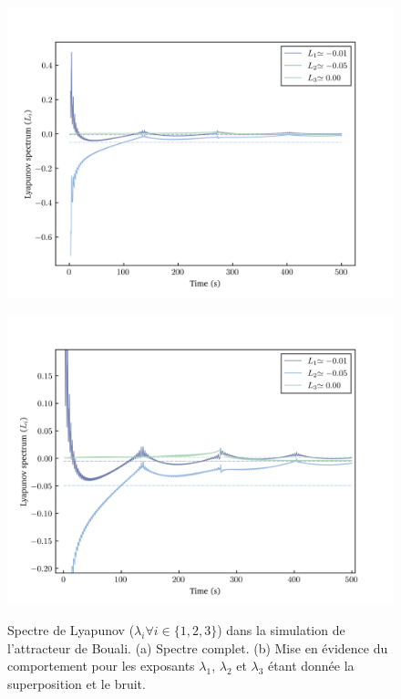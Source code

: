     \clearpage

    \begin{figure}[h!]
        \centering
        \begin{minipage}{0.49\textwidth}
          \centering
          \includegraphics[scale = 0.4]{figs/lyapunovs/lyap_bouali.png}
          \subcaption{}
          \label{fig: lyap_bouali}
        \end{minipage}
        \begin{minipage}{0.49\textwidth}
          \centering
          \includegraphics[scale = 0.4]{figs/lyapunovs/lyap_bouali_zoom.png}
          \subcaption{}
          \label{fig: lyap_bouali_zoom}
        \end{minipage}
        \caption{Spectre de Lyapunov ($\lambda_i\forall i\in\{1, 2, 3\}$) dans
        la simulation de l'attracteur de Bouali. (a) Spectre complet. (b) Mise
    en évidence du comportement pour les exposants $\lambda_1$, $\lambda_2$ et
$\lambda_3$ étant donnée la superposition et le bruit.}
        \label{fig : lyaps_bouali}
    \end{figure}

\twocolumngrid
